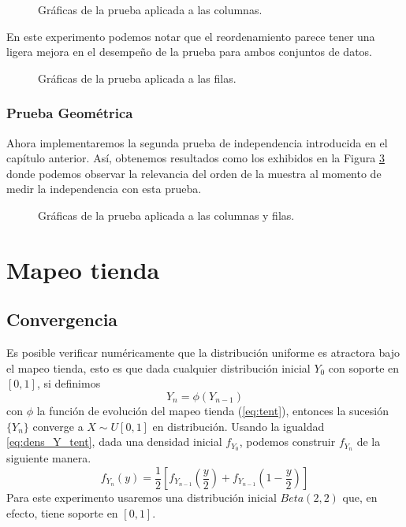 \documentclass[../Main.tex]{subfiles}
\begin{document}
\begin{figure}[h!]
\hfill
{}
\hfill
{}
\hfill
\caption{Gráficas de la prueba aplicada a las columnas.}
\label{fig:PCC_R30_col}
\end{figure}

En este experimento podemos notar que el reordenamiento parece tener una ligera mejora en el desempeño de la prueba para ambos conjuntos de datos.
\begin{figure}[h!]
\hfill
{}
\hfill
{}
\hfill
\caption{Gráficas de la prueba aplicada a las filas.}
\label{fig:PCC_R30_fila}
\end{figure}

\subsubsection{Prueba Geométrica}
Ahora implementaremos la segunda prueba de independencia introducida en el capítulo anterior. Así, obtenemos resultados como los exhibidos en la Figura  \ref{fig:PG_R30} donde podemos observar la relevancia del orden de la muestra al momento de medir la independencia con esta prueba. 
\begin{figure}[h!]
\hfill
{}
\hfill
{}
\hfill
\caption{Gráficas de la prueba aplicada a las columnas y filas.}
\label{fig:PG_R30}
\end{figure}

\section{Mapeo tienda}
\subsection{Convergencia}
Es posible verificar numéricamente que la distribución uniforme es atractora bajo el mapeo tienda, esto es que dada cualquier distribución inicial $Y_0$ con soporte en $[0,1]$, si definimos $$Y_n = \phi(Y_{n-1})$$ con $\phi$ la función de evolución del mapeo tienda (\ref{eq:tent}), entonces la sucesión $\{Y_n\}$ converge a $X\sim U[0,1]$ en distribución. Usando la igualdad \ref{eq:dens_Y_tent}, dada una densidad inicial $f_{Y_{0}}$, podemos construir $f_{Y{_n}}$ de la siguiente manera.
\begin{equation}
    f_{Y_{n}}(y)=\frac{1}{2}\left[f_{Y_{n-1}}\left(\frac{y}{2}\right)+f_{Y_{n-1}}\left(1-\frac{y}{2}\right)\right]
    \label{eq:dens_Yn_tent}
\end{equation}
Para este experimento usaremos una distribución inicial $Beta(2,2)$ que, en efecto, tiene soporte en $[0,1]$.
\end{document}

